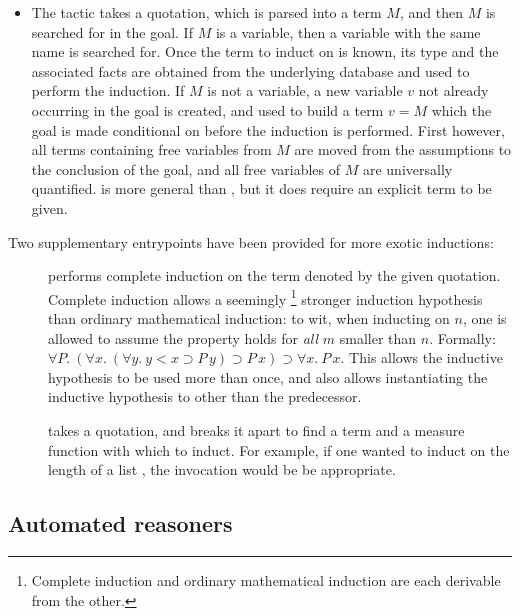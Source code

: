 \begin{itemize}
\item The  tactic takes a quotation, which is
parsed into a term $M$, and then $M$ is searched for in the goal. If $M$
is a variable, then a variable with the same name is searched for. Once
the term to induct on is known, its type and the associated facts are
obtained from the underlying database and used to perform the induction.
If $M$ is not a variable, a new variable $v$ not already occurring in
the goal is created, and used to build a term $v = M$ which the goal is
made conditional on before the induction is performed. First however,
all terms containing free variables from $M$ are moved from the
assumptions to the conclusion of the goal, and all free variables of $M$
are universally quantified.  is more general than
, but it does require an explicit term to be given.

\end{itemize}

Two supplementary entrypoints have been provided for more exotic
inductions:
\begin{description}
\item [] performs complete induction on the
  term denoted by the given quotation. Complete induction allows a
  seemingly \footnote{Complete induction and ordinary mathematical
    induction are each derivable from the other.} stronger induction
  hypothesis than ordinary mathematical induction: to wit, when
  inducting on $n$, one is allowed to assume the property holds for
  \emph{all} $m$ smaller than $n$. Formally: $\forall P.\ (\forall x.\
  (\forall y.\ y < x \supset P\, y) \supset P\,x) \supset \forall x.\
  P\,x$. This allows the inductive hypothesis to be used more than
  once, and also allows instantiating the inductive hypothesis to
  other than the predecessor.

\item [] takes a quotation, and breaks it
  apart to find a term and a measure function with which to induct.
  For example, if one wanted to induct on the length of a list
  \holtxt{L}, the invocation \ml{measureInduct\_on~`LENGTH L`}
  would be be appropriate.

\end{description}


\subsection{Automated reasoners}
\label{sec:automated-reasoners}

